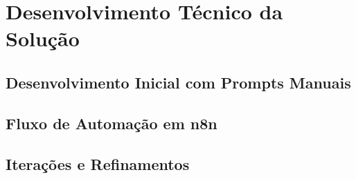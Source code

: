 \chapter{Desenvolvimento T\'ecnico da Solu\c{c}\~ao}
\label{chap:desenvolvimento}

\section{Desenvolvimento Inicial com Prompts Manuais}
\label{sec:dev-manual}

\section{Fluxo de Automa\c{c}\~ao em n8n}
\label{sec:dev-workflow}

\section{Itera\c{c}\~oes e Refinamentos}
\label{sec:dev-iteracoes}
